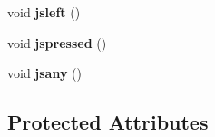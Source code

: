 \begin{DoxyCompactItemize}
\item 
void {\bfseries jsleft} ()\hypertarget{class_roomba_sense_h_a_t_a3c95037a3029d463e3fb9b09c33c6951}{}\label{class_roomba_sense_h_a_t_a3c95037a3029d463e3fb9b09c33c6951}

\item 
void {\bfseries jspressed} ()\hypertarget{class_roomba_sense_h_a_t_a7152dba35234970a98ed54b17bf2552b}{}\label{class_roomba_sense_h_a_t_a7152dba35234970a98ed54b17bf2552b}

\item 
void {\bfseries jsany} ()\hypertarget{class_roomba_sense_h_a_t_a5bf1619e5171d1a870de74d86d6c97e3}{}\label{class_roomba_sense_h_a_t_a5bf1619e5171d1a870de74d86d6c97e3}

\end{DoxyCompactItemize}
\subsection*{Protected Attributes}

